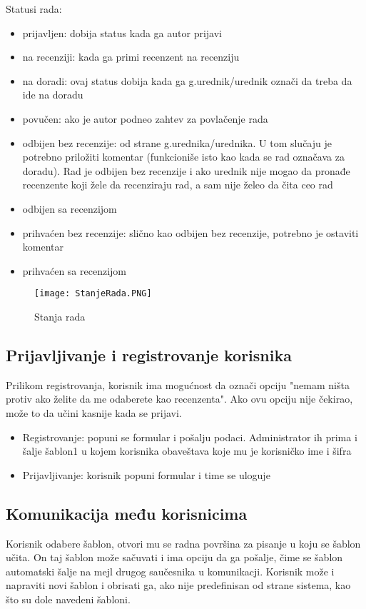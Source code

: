 \documentclass[a4paper]{article}
\begin{document}
    Statusi rada:
    \begin{itemize}
        \item prijavljen: dobija status kada ga autor prijavi
        \item na recenziji: kada ga primi recenzent na recenziju
        \item na doradi: ovaj status dobija kada ga g.urednik/urednik označi da treba da ide na doradu
        \item povučen: ako je autor podneo zahtev za povlačenje rada
        \item odbijen bez recenzije: od strane g.urednika/urednika. U tom slučaju je potrebno priložiti komentar (funkcioniše isto kao kada se rad označava za doradu). Rad je odbijen bez recenzije i ako urednik nije mogao da pronađe recenzente koji žele da recenziraju rad, a sam nije želeo da čita ceo rad
        \item odbijen sa recenzijom
        \item prihvaćen bez recenzije: slično kao odbijen bez recenzije, potrebno je ostaviti komentar
        \item prihvaćen sa recenzijom
    \end{itemize}


\begin{figure}[hbt!]
    \centering
    \texttt{[image: StanjeRada.PNG]}
    \caption{Stanja rada}
    \label{fig:my_label}
\end{figure}


\subsection{Prijavljivanje i registrovanje korisnika}
Prilikom registrovanja, korisnik ima mogućnost da označi opciju "nemam ništa protiv ako želite da me odaberete kao recenzenta". Ako ovu opciju nije čekirao, može to da učini kasnije kada se prijavi.
\begin{itemize}
    \item Registrovanje: popuni se formular i pošalju podaci. Administrator ih prima i šalje šablon1 u kojem korisnika obaveštava koje mu je korisničko ime i šifra
    \item Prijavljivanje: korisnik popuni formular i time se uloguje
\end{itemize}

\subsection{Komunikacija među korisnicima}
Korisnik odabere šablon, otvori mu se radna površina za pisanje u koju se šablon učita. On taj šablon može sačuvati i ima opciju da ga pošalje, čime se šablon automatski šalje na mejl drugog saučesnika u komunikacji. Korisnik može i napraviti novi šablon i obrisati ga, ako nije predefinisan od strane sistema, kao što su dole navedeni šabloni.
\end{document}
